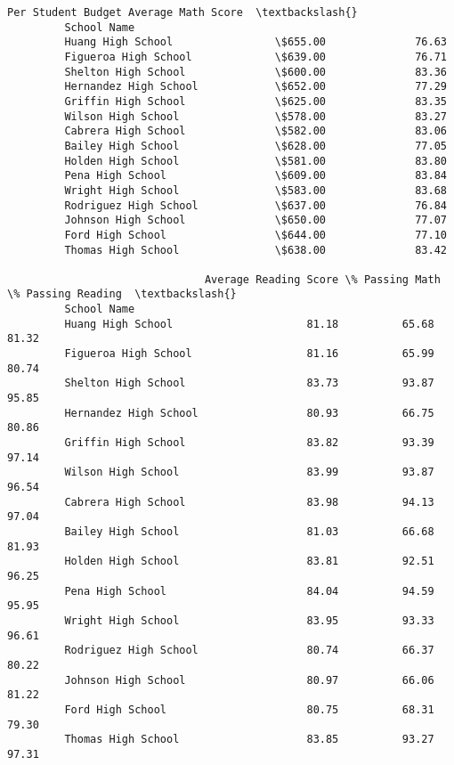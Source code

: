 \documentclass[11pt]{article}
\begin{document}
\begin{Verbatim}[commandchars=\\\{\}]
                               Per Student Budget Average Math Score  \textbackslash{}
         School Name                                                   
         Huang High School                \$655.00              76.63   
         Figueroa High School             \$639.00              76.71   
         Shelton High School              \$600.00              83.36   
         Hernandez High School            \$652.00              77.29   
         Griffin High School              \$625.00              83.35   
         Wilson High School               \$578.00              83.27   
         Cabrera High School              \$582.00              83.06   
         Bailey High School               \$628.00              77.05   
         Holden High School               \$581.00              83.80   
         Pena High School                 \$609.00              83.84   
         Wright High School               \$583.00              83.68   
         Rodriguez High School            \$637.00              76.84   
         Johnson High School              \$650.00              77.07   
         Ford High School                 \$644.00              77.10   
         Thomas High School               \$638.00              83.42   
         
                               Average Reading Score \% Passing Math \% Passing Reading  \textbackslash{}
         School Name                                                                    
         Huang High School                     81.18          65.68             81.32   
         Figueroa High School                  81.16          65.99             80.74   
         Shelton High School                   83.73          93.87             95.85   
         Hernandez High School                 80.93          66.75             80.86   
         Griffin High School                   83.82          93.39             97.14   
         Wilson High School                    83.99          93.87             96.54   
         Cabrera High School                   83.98          94.13             97.04   
         Bailey High School                    81.03          66.68             81.93   
         Holden High School                    83.81          92.51             96.25   
         Pena High School                      84.04          94.59             95.95   
         Wright High School                    83.95          93.33             96.61   
         Rodriguez High School                 80.74          66.37             80.22   
         Johnson High School                   80.97          66.06             81.22   
         Ford High School                      80.75          68.31             79.30   
         Thomas High School                    83.85          93.27             97.31   
         

\end{Verbatim}
\end{document}
